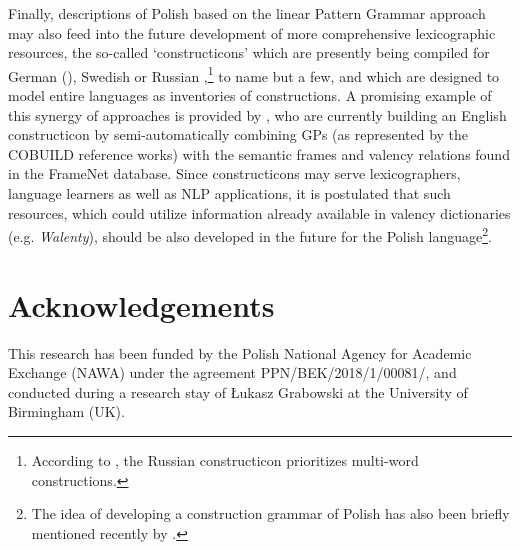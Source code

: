 \documentclass[output=paper]{langscibook}
\begin{document}
Finally, descriptions of Polish based on the linear Pattern Grammar approach may also feed into the future development of more comprehensive lexicographic resources, the so-called ‘constructicons’ which are presently being compiled for German (\citealt{BoasZiem2018}), Swedish \citep{LyngfeltEtAl2018AtWork} or Russian \citep{JandaEtAl2018},\footnote{According to \citet[165]{JandaEtAl2018}, the Russian constructicon prioritizes multi-word constructions.} to name but a few, and which are designed to model entire languages as inventories of constructions. A promising example of this synergy of approaches is provided by \citet{PerekPatten2019}, who are currently building an English constructicon by semi-automatically combining GPs (as represented by the COBUILD reference works) with the semantic frames and valency relations found in the FrameNet database. Since constructicons may serve lexicographers, language learners as well as NLP applications, it is postulated that such resources, which could utilize information already available in valency dictionaries (e.g. \textit{Walenty}), should be also developed in the future for the Polish language\footnote{The idea of developing a construction grammar of Polish has also been briefly mentioned recently by \citet{Wierzbicka-Piotrowska2019}.}.


\section*{Acknowledgements}
This research has been funded by the Polish National Agency for Academic Exchange (NAWA) under the agreement PPN/BEK/2018/1/00081/, and conducted during a research stay of Łukasz Grabowski at the University of Birmingham (UK).

{\sloppy\printbibliography[heading=subbibliography,notkeyword=this]}
\end{document}
